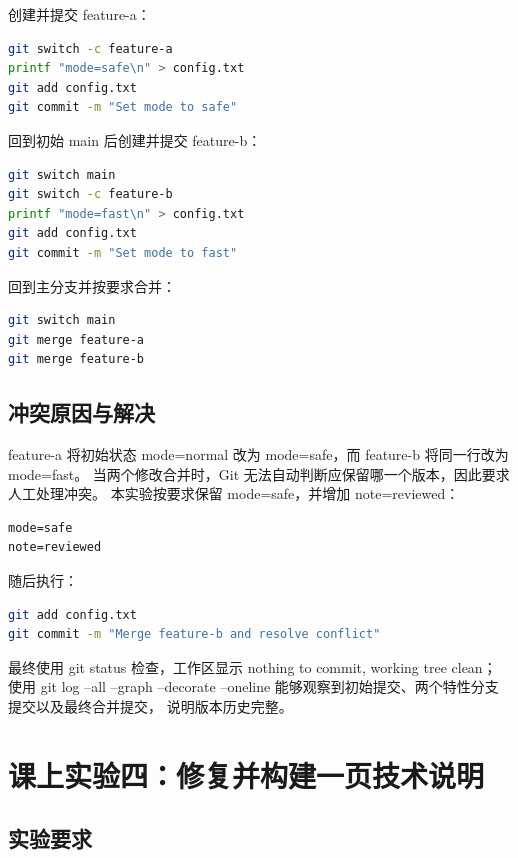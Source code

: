 \documentclass[UTF8]{ctexart}
\begin{document}
创建并提交 feature-a：

\begin{lstlisting}[language=bash]
git switch -c feature-a
printf "mode=safe\n" > config.txt
git add config.txt
git commit -m "Set mode to safe"
\end{lstlisting}

回到初始 main 后创建并提交 feature-b：

\begin{lstlisting}[language=bash]
git switch main
git switch -c feature-b
printf "mode=fast\n" > config.txt
git add config.txt
git commit -m "Set mode to fast"
\end{lstlisting}

回到主分支并按要求合并：

\begin{lstlisting}[language=bash]
git switch main
git merge feature-a
git merge feature-b
\end{lstlisting}

\subsection{冲突原因与解决}

feature-a 将初始状态 mode=normal 改为 mode=safe，而 feature-b 将同一行改为 mode=fast。
当两个修改合并时，Git 无法自动判断应保留哪一个版本，因此要求人工处理冲突。
本实验按要求保留 mode=safe，并增加 note=reviewed：

\begin{lstlisting}
mode=safe
note=reviewed
\end{lstlisting}

随后执行：

\begin{lstlisting}[language=bash]
git add config.txt
git commit -m "Merge feature-b and resolve conflict"
\end{lstlisting}

最终使用 git status 检查，工作区显示 nothing to commit, working tree clean；
使用 git log --all --graph --decorate --oneline 能够观察到初始提交、两个特性分支提交以及最终合并提交，
说明版本历史完整。


\section{课上实验四：修复并构建一页技术说明}

\subsection{实验要求}
\end{document}
